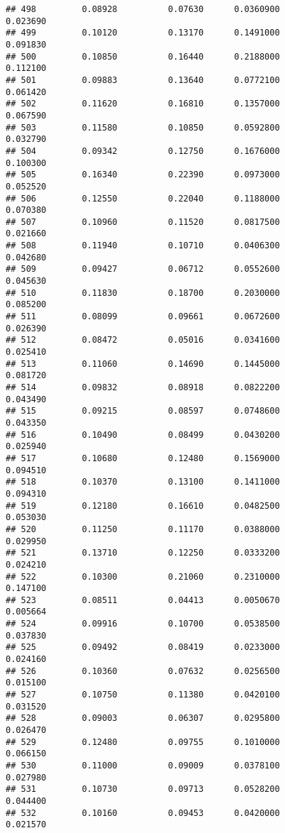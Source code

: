 \documentclass[
]{article}
\begin{document}
\begin{verbatim}
## 498         0.08928          0.07630      0.0360900            0.023690
## 499         0.10120          0.13170      0.1491000            0.091830
## 500         0.10850          0.16440      0.2188000            0.112100
## 501         0.09883          0.13640      0.0772100            0.061420
## 502         0.11620          0.16810      0.1357000            0.067590
## 503         0.11580          0.10850      0.0592800            0.032790
## 504         0.09342          0.12750      0.1676000            0.100300
## 505         0.16340          0.22390      0.0973000            0.052520
## 506         0.12550          0.22040      0.1188000            0.070380
## 507         0.10960          0.11520      0.0817500            0.021660
## 508         0.11940          0.10710      0.0406300            0.042680
## 509         0.09427          0.06712      0.0552600            0.045630
## 510         0.11830          0.18700      0.2030000            0.085200
## 511         0.08099          0.09661      0.0672600            0.026390
## 512         0.08472          0.05016      0.0341600            0.025410
## 513         0.11060          0.14690      0.1445000            0.081720
## 514         0.09832          0.08918      0.0822200            0.043490
## 515         0.09215          0.08597      0.0748600            0.043350
## 516         0.10490          0.08499      0.0430200            0.025940
## 517         0.10680          0.12480      0.1569000            0.094510
## 518         0.10370          0.13100      0.1411000            0.094310
## 519         0.12180          0.16610      0.0482500            0.053030
## 520         0.11250          0.11170      0.0388000            0.029950
## 521         0.13710          0.12250      0.0333200            0.024210
## 522         0.10300          0.21060      0.2310000            0.147100
## 523         0.08511          0.04413      0.0050670            0.005664
## 524         0.09916          0.10700      0.0538500            0.037830
## 525         0.09492          0.08419      0.0233000            0.024160
## 526         0.10360          0.07632      0.0256500            0.015100
## 527         0.10750          0.11380      0.0420100            0.031520
## 528         0.09003          0.06307      0.0295800            0.026470
## 529         0.12480          0.09755      0.1010000            0.066150
## 530         0.11000          0.09009      0.0378100            0.027980
## 531         0.10730          0.09713      0.0528200            0.044400
## 532         0.10160          0.09453      0.0420000            0.021570

\end{verbatim}
\end{document}
